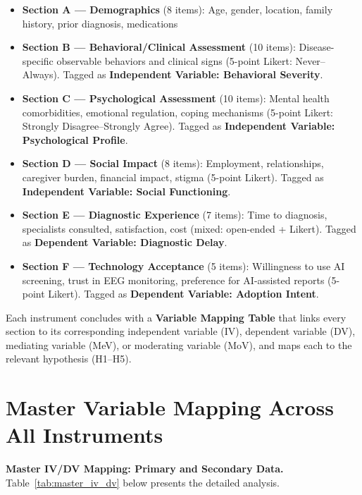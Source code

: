 \begin{itemize}[nosep,leftmargin=1.5em]
\item \textbf{Section A --- Demographics} (8 items): Age, gender, location, family history, prior diagnosis, medications
\item \textbf{Section B --- Behavioral/Clinical Assessment} (10 items): Disease-specific observable behaviors and clinical signs (5-point Likert: Never--Always). Tagged as \textbf{Independent Variable: Behavioral Severity}.
\item \textbf{Section C --- Psychological Assessment} (10 items): Mental health comorbidities, emotional regulation, coping mechanisms (5-point Likert: Strongly Disagree--Strongly Agree). Tagged as \textbf{Independent Variable: Psychological Profile}.
\item \textbf{Section D --- Social Impact} (8 items): Employment, relationships, caregiver burden, financial impact, stigma (5-point Likert). Tagged as \textbf{Independent Variable: Social Functioning}.
\item \textbf{Section E --- Diagnostic Experience} (7 items): Time to diagnosis, specialists consulted, satisfaction, cost (mixed: open-ended + Likert). Tagged as \textbf{Dependent Variable: Diagnostic Delay}.
\item \textbf{Section F --- Technology Acceptance} (5 items): Willingness to use AI screening, trust in EEG monitoring, preference for AI-assisted reports (5-point Likert). Tagged as \textbf{Dependent Variable: Adoption Intent}.
\end{itemize}

\noindent Each instrument concludes with a \textbf{Variable Mapping Table} that links every section to its corresponding independent variable (IV), dependent variable (DV), mediating variable (MeV), or moderating variable (MoV), and maps each to the relevant hypothesis (H1--H5).

\section*{Master Variable Mapping Across All Instruments}

\noindent\textbf{Master IV/DV Mapping: Primary and Secondary Data.} Table~\ref{tab:master_iv_dv} below presents the detailed analysis.

